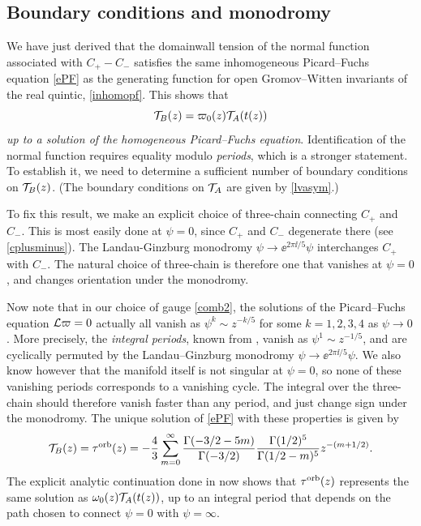 \subsection{Boundary conditions and monodromy}

We have just derived that the domainwall tension of the normal function 
associated with $C_+-C_-$ satisfies the same inhomogeneous Picard--Fuchs
equation \eqref{ePF} as the generating function for open Gromov--Witten 
invariants of the real quintic, \eqref{inhomopf}. This shows that
\begin{equation}
\eqlabel{showsthat}
\calt_B(z) = \varpi_0(z) \calt_A(t(z))
\end{equation}
{\it up to a solution of the homogeneous Picard--Fuchs equation}.
Identification of the normal function requires equality modulo
{\it periods}, which is a stronger statement. To establish it,
we need to determine a sufficient number of boundary conditions 
on ${\cal T}_B(z)$. (The boundary conditions on ${\cal T}_A$ are given
by \eqref{lvasym}.)

To fix this result, we make an explicit choice of three-chain
connecting $C_+$ and $C_-$. This is most easily done at $\psi=0$,
since $C_+$ and $C_-$ degenerate there (see \eqref{cplusminus}).
The Landau-Ginzburg monodromy $\psi\to \ee^{2\pi\ii/5}\psi$ 
interchanges $C_+$ with $C_-$. The natural choice of three-chain 
is therefore one that vanishes at $\psi = 0$, and changes orientation 
under the monodromy.

Now note that in our choice of gauge \eqref{comb2}, the solutions
of the Picard--Fuchs equation ${\cal L}\varpi=0$ actually all vanish 
as $\psi^k\sim z^{-k/5}$ for some $k=1,2,3,4$ as $\psi\to 0$. More 
precisely, the {\it integral periods}, known from \cite{cdgp}, 
vanish as $\psi^1\sim z^{-1/5}$, and are cyclically permuted by the 
Landau--Ginzburg monodromy $\psi\to\ee^{2\pi\ii/5}\psi$. We also
know however that the manifold itself is not singular at $\psi=0$,
so none of these vanishing periods corresponds to a vanishing cycle.
The integral over the three-chain should therefore vanish faster than
any period, and just change sign under the monodromy. The unique 
solution of \eqref{ePF} with these properties is given by
\begin{equation}
{\cal T}_B(z) =\tau^{\rm orb}(z) = -\frac{4}{3}\sum_{m=0}^\infty 
\frac{\Gamma(-3/2-5m)}{\Gamma(-3/2)}
\frac{\Gamma(1/2)^5}{\Gamma(1/2-m)^5} z^{-(m+1/2)} .
\end{equation}
The explicit analytic continuation done in \cite{open} now shows
that $\tau^{\rm orb}(z)$ represents the same solution as 
$\omega_0(z){\cal T}_A(t(z))$, up to an integral period that
depends on the path chosen to connect $\psi=0$ with $\psi=\infty$.


